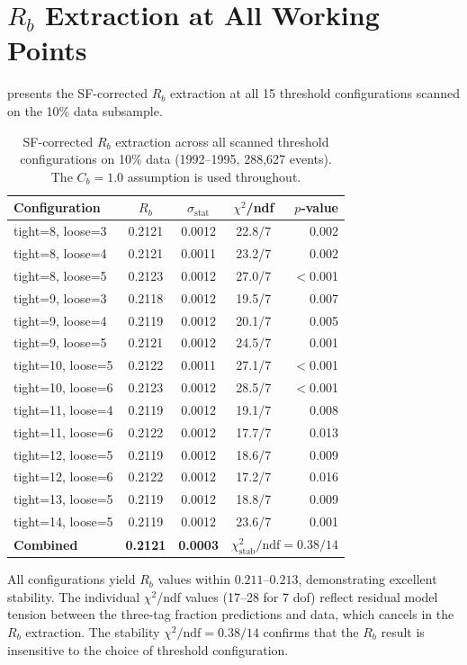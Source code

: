 \documentclass[11pt,a4paper]{article}
\begin{document}
\section{$R_b$ Extraction at All Working Points}
\label{app:rb_all_wp}

 presents the SF-corrected $R_b$ extraction
at all 15 threshold configurations scanned on the 10\% data
subsample.

\begin{table}[htbp]
\centering
\caption{SF-corrected $R_b$ extraction across all scanned
threshold configurations on 10\% data (1992--1995, 288,627
events). The $C_b = 1.0$ assumption is used throughout.}
\label{tbl:rb_all_wp}
\begin{tabular}{lcccr}
\toprule
Configuration & $R_b$ & $\sigma_\text{stat}$ &
$\chi^2$/ndf & $p$-value \\
\midrule
tight=8, loose=3  & 0.2121 & 0.0012 & 22.8/7 & 0.002 \\
tight=8, loose=4  & 0.2121 & 0.0011 & 23.2/7 & 0.002 \\
tight=8, loose=5  & 0.2123 & 0.0012 & 27.0/7 & $<$0.001 \\
tight=9, loose=3  & 0.2118 & 0.0012 & 19.5/7 & 0.007 \\
tight=9, loose=4  & 0.2119 & 0.0012 & 20.1/7 & 0.005 \\
tight=9, loose=5  & 0.2121 & 0.0012 & 24.5/7 & 0.001 \\
tight=10, loose=5 & 0.2122 & 0.0011 & 27.1/7 & $<$0.001 \\
tight=10, loose=6 & 0.2123 & 0.0012 & 28.5/7 & $<$0.001 \\
tight=11, loose=4 & 0.2119 & 0.0012 & 19.1/7 & 0.008 \\
tight=11, loose=6 & 0.2122 & 0.0012 & 17.7/7 & 0.013 \\
tight=12, loose=5 & 0.2119 & 0.0012 & 18.6/7 & 0.009 \\
tight=12, loose=6 & 0.2122 & 0.0012 & 17.2/7 & 0.016 \\
tight=13, loose=5 & 0.2119 & 0.0012 & 18.8/7 & 0.009 \\
tight=14, loose=5 & 0.2119 & 0.0012 & 23.6/7 & 0.001 \\
\midrule
\textbf{Combined} & \textbf{0.2121} & \textbf{0.0003} &
\multicolumn{2}{c}{$\chi^2_\text{stab}/\text{ndf} = 0.38/14$} \\
\bottomrule
\end{tabular}
\end{table}

All configurations yield $R_b$ values within $0.211$--$0.213$,
demonstrating excellent stability.
The individual $\chi^2$/ndf values (17--28 for 7 dof) reflect
residual model tension between the three-tag fraction predictions
and data, which cancels in the $R_b$ extraction.
The stability $\chi^2/\text{ndf} = 0.38/14$ confirms that the
$R_b$ result is insensitive to the choice of threshold
configuration.
\end{document}
